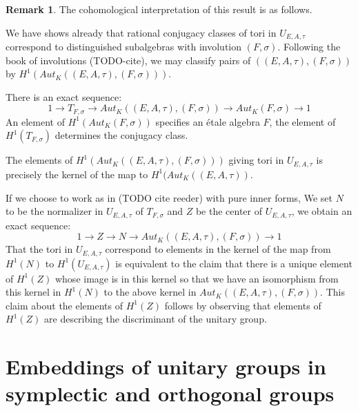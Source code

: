 \documentclass{article}
\theoremstyle{plain}
\theoremstyle{definition}
\newtheorem{remark}[theorem]{Remark}
\numberwithin{equation}{section}
\begin{document}
\begin{remark}
The cohomological interpretation of this result is as follows.

We have shows already that rational conjugacy classes of tori in $U_{E,A,\tau}$ correspond to distinguished subalgebras with involution $(F,\sigma)$.
Following the book of involutions (TODO-cite), we may classify pairs of $((E,A,\tau),(F,\sigma))$ by $H^1(Aut_K((E,A,\tau),(F,\sigma)))$.

There is an exact sequence:
\[ 1 \rightarrow T_{F,\sigma} \rightarrow Aut_K((E,A,\tau),(F,\sigma)) \rightarrow Aut_K(F,\sigma) \rightarrow 1 \]
An element of $H^1(Aut_K(F,\sigma))$ specifies an \'etale algebra $F$, the element of $H^1(T_{F,\sigma})$ determines the conjugacy class.

The elements of $H^1( Aut_K((E,A,\tau),(F,\sigma)))$ giving tori in $U_{E,A,\tau}$ is precisely the kernel of the map to $H^1(Aut_K((E,A,\tau))$.

If we choose to work as in  (TODO cite reeder) with pure inner forms,
We set $N$ to be the normalizer in $U_{E,A,\tau}$ of $T_{F,\sigma}$ and $Z$ be the center of $U_{E,A,\tau}$, we obtain an exact sequence:
\[ 1 \rightarrow Z \rightarrow N \rightarrow Aut_K((E,A,\tau),(F,\sigma)) \rightarrow 1 \]
That the tori in $U_{E,A,\tau}$ correspond to elements in the kernel of the map from $H^1(N)$ to $H^1(U_{E,A,\tau})$ is equivalent to the claim that there is a unique element of $H^1(Z)$ whose image is in this kernel so that we have an isomorphism from this kernel in $H^1(N)$ to the above kernel in $Aut_K((E,A,\tau),(F,\sigma))$. This claim about the elements of $H^1(Z)$ follows by observing that elements of $H^1(Z)$ are describing the discriminant of the unitary group.
\end{remark}

\section{Embeddings of unitary groups in symplectic and orthogonal groups}
\end{document}
